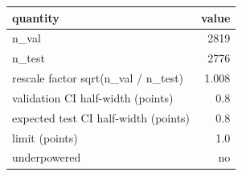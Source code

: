 \begin{tabular}{lr}
\toprule
quantity & value \\
\midrule
n\_val & 2819 \\
n\_test & 2776 \\
rescale factor sqrt(n\_val / n\_test) & 1.008 \\
validation CI half-width (points) & 0.8 \\
expected test CI half-width (points) & 0.8 \\
limit (points) & 1.0 \\
underpowered & no \\
\bottomrule
\end{tabular}
